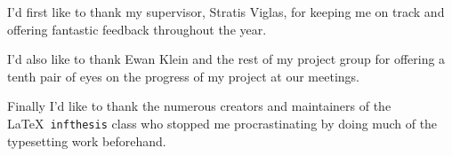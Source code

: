 \begin{acknowledgements}
	I'd first like to thank my supervisor, Stratis Viglas, for keeping me on track and offering fantastic feedback throughout the year.

	I'd also like to thank Ewan Klein and the rest of my project group for offering a tenth pair of eyes on the progress of my project at our meetings. 

	Finally I'd like to thank the numerous creators and maintainers of the \LaTeX\ \texttt{infthesis} class who stopped me procrastinating by doing much of the typesetting work beforehand.
\end{acknowledgements}